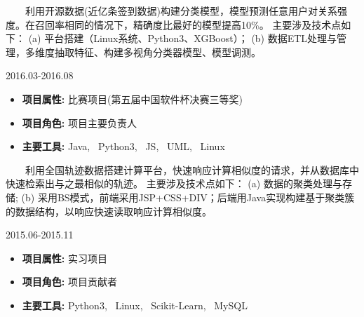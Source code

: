 \documentclass{resume}
\begin{document}
{ \ \ \ \ 利用开源数据(近亿条签到数据)构建分类模型，模型预测任意用户对关系强度。在召回率相同的情况下，精确度比最好的模型提高10\%。
主要涉及技术点如下：
(a) 平台搭建（Linux系统、Python3、XGBoost）；
(b) 数据ETL处理与管理，多维度抽取特征、构建多视角分类器模型、模型调测。}

\medskip





                                 {2016.03-2016.08}

\begin{itemize} [parsep=0.3ex]

  \item   \textbf{ 项目属性: }      {比赛项目(第五届中国软件杯决赛三等奖)}
  \item   \textbf{ 项目角色: }      {项目主要负责人}
  \item   \textbf{ 主要工具: }      { Java, \ Python3, \ JS, \ UML, \ Linux }

\end{itemize}


{ \ \ \ \ 利用全国轨迹数据搭建计算平台，快速响应计算相似度的请求，并从数据库中快速检索出与之最相似的轨迹。
主要涉及技术点如下：
(a) 数据的聚类处理与存储;
(b) 采用BS模式，前端采用JSP+CSS+DIV；后端用Java实现构建基于聚类簇的数据结构，以响应快速读取响应计算相似度。 }

\medskip





              {2015.06-2015.11}

\begin{itemize} [parsep=0.3ex]

  \item    \textbf{  项目属性:  }      { 实习项目 }
  \item       \textbf{  项目角色:  }       { 项目贡献者 }
  \item       \textbf{  主要工具:  }       { Python3, \ Linux, \ Scikit-Learn, \ MySQL }

\end{itemize}
\end{document}
